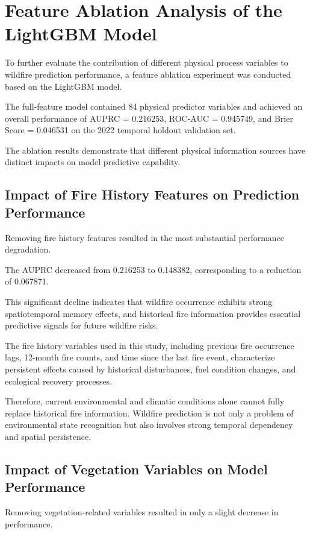 \section{Feature Ablation Analysis of the LightGBM Model}

To further evaluate the contribution of different physical process variables to wildfire prediction performance, a feature ablation experiment was conducted based on the LightGBM model.

The full-feature model contained 84 physical predictor variables and achieved an overall performance of AUPRC = 0.216253, ROC-AUC = 0.945749, and Brier Score = 0.046531 on the 2022 temporal holdout validation set.

The ablation results demonstrate that different physical information sources have distinct impacts on model predictive capability.


\subsection{Impact of Fire History Features on Prediction Performance}

Removing fire history features resulted in the most substantial performance degradation.

The AUPRC decreased from 0.216253 to 0.148382, corresponding to a reduction of 0.067871.

This significant decline indicates that wildfire occurrence exhibits strong spatiotemporal memory effects, and historical fire information provides essential predictive signals for future wildfire risks.

The fire history variables used in this study, including previous fire occurrence lags, 12-month fire counts, and time since the last fire event, characterize persistent effects caused by historical disturbances, fuel condition changes, and ecological recovery processes.

Therefore, current environmental and climatic conditions alone cannot fully replace historical fire information. Wildfire prediction is not only a problem of environmental state recognition but also involves strong temporal dependency and spatial persistence.


\subsection{Impact of Vegetation Variables on Model Performance}

Removing vegetation-related variables resulted in only a slight decrease in performance.

